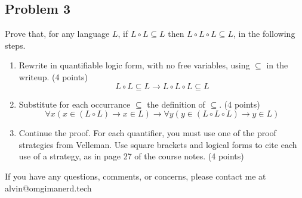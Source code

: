 \documentclass[letterpaper, 12pt]{math}
\begin{document}
\subsection*{Problem 3}
Prove that, for any language \( L \), if \( L\circ L \subseteq L \) then
\( L \circ L \circ L \subseteq L \), in the following steps.
\begin{enumerate}
  \item Rewrite in quantifiable logic form, with no free variables, using
    \( \subseteq \) in the writeup. (4 points)
    \[ L\circ L\subseteq L \to L\circ L\circ L\subseteq L \]
  \item Substitute for each occurrance \( \subseteq \) the definition of
    \( \subseteq \). (4 points)
    \[ \forall{x}(x\in(L\circ L)\to x\in L)\to
      \forall{y}(y\in(L\circ L\circ L)\to y\in L) \]
  \item Continue the proof. For each quantifier, you must use one of the proof
    strategies from Velleman. Use square brackets and logical forms to cite
    each use of a strategy, as in page 27 of the course notes. (4 points)
\end{enumerate}

\begin{center}
  If you have any questions, comments, or concerns, please contact me at
  alvin@omgimanerd.tech
\end{center}
\end{document}
